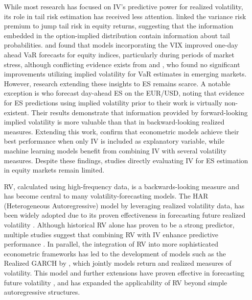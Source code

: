 While most research has focused on IV's predictive power for realized volatility, its role in tail risk estimation has received less attention. \textcite{Bollerslev2014} linked the variance risk premium to jump tail risk in equity returns, suggesting that the information embedded in the option-implied distribution contain information about tail probabilities. \textcite{giot2005implied} and \textcite{angelidis2008forecasting} found that models incorporating the VIX improved one-day ahead VaR forecasts for equity indices, particularly during periods of market stress, although conflicting evidence exists from \textcite{Chong2004} and \textcite{Kim2015}, who found no significant improvements utilizing implied volatility for VaR estimates in emerging markets. However, research extending these insights to ES remains scarce. A notable exception is \textcite{Lycsa2024} who forecast day-ahead ES on the EUR/USD, noting that evidence for ES predictions using implied volatility prior to their work is virtually non-existent. Their results demonstrate that information provided by forward-looking implied volatility is more valuable than that in backward-looking realized measures. Extending this work, \textcite{moen2024forecasting} confirm that econometric models achieve their best performance when only IV is included as explanatory variable, while machine learning models benefit from combining IV with several volatility measures. Despite these findings, studies directly evaluating IV for ES estimation in equity markets remain limited. 

RV, calculated using high-frequency data, is a backwards-looking measure and has become central to many volatility-forecasting models. The HAR (Heterogeneous Autoregressive) model by \textcite{corsi2009har} leveraging realized volatility data, has been widely adopted due to its proven effectiveness in forecasting future realized volatility \parencite{Bollerslev2016, gong2019modeling}. Although historical RV alone has proven to be a strong predictor, multiple studies suggest that combining RV with IV enhance predictive performance \parencite{Xiao2021,shu2001relation}. In parallel, the integration of RV into more sophisticated econometric frameworks has led to the development of models such as the Realized GARCH by \textcite{Hansen2011}, which jointly models return and realized measures of volatility. This model and further extensions have proven effective in forecasting future volatility \parencite{Gerlach2016, WATANABE2011, Jiang2018}, and has expanded the applicability of RV beyond simple autoregressive structures.


